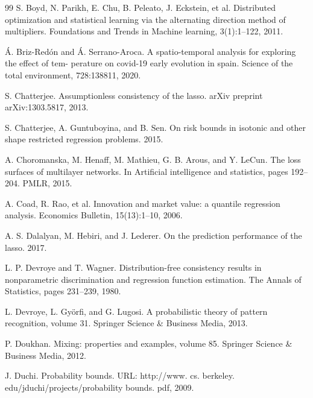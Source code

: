 \documentclass[twoside,11pt]{article}
\begin{document}
\begin{thebibliography}{99}
 S. Boyd, N. Parikh, E. Chu, B. Peleato, J. Eckstein, et al. Distributed optimization and statistical learning via the alternating direction method of multipliers. Foundations and Trends\textregistered{} in Machine learning, 3(1):1--122, 2011.

 Á. Briz-Redón and Á. Serrano-Aroca. A spatio-temporal analysis for exploring the effect of tem- perature on covid-19 early evolution in spain. Science of the total environment, 728:138811, 2020.

 S. Chatterjee. Assumptionless consistency of the lasso. arXiv preprint arXiv:1303.5817, 2013.

 S. Chatterjee, A. Guntuboyina, and B. Sen. On risk bounds in isotonic and other shape restricted regression problems. 2015.

 A. Choromanska, M. Henaff, M. Mathieu, G. B. Arous, and Y. LeCun. The loss surfaces of multilayer networks. In Artificial intelligence and statistics, pages 192--204. PMLR, 2015.

 A. Coad, R. Rao, et al. Innovation and market value: a quantile regression analysis. Economics Bulletin, 15(13):1--10, 2006.

 A. S. Dalalyan, M. Hebiri, and J. Lederer. On the prediction performance of the lasso. 2017.

 L. P. Devroye and T. Wagner. Distribution-free consistency results in nonparametric discrimination and regression function estimation. The Annals of Statistics, pages 231--239, 1980.

 L. Devroye, L. Györfi, and G. Lugosi. A probabilistic theory of pattern recognition, volume 31. Springer Science \& Business Media, 2013.

 P. Doukhan. Mixing: properties and examples, volume 85. Springer Science \& Business Media, 2012.

 J. Duchi. Probability bounds. URL: http://www. cs. berkeley. edu/jduchi/projects/probability bounds. pdf, 2009.


\end{thebibliography}
\end{document}
